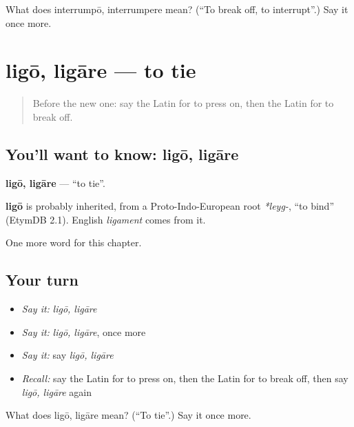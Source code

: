 \begin{tcolorbox}[breakable,colback=teal!4,colframe=teal!35!black,title={Before you move on}]
What does interrumpō, interrumpere mean? (\textquotedblleft{}To break off, to interrupt\textquotedblright{}.) Say it once more.
\end{tcolorbox}
\section[ligō, ligāre]{ligō, ligāre — to tie}

\label{lesson:LA-C233-ligo}



\begin{quote}
Before the new one: say the Latin for to press on, then the Latin for to break off.
\end{quote}

\subsection*{You'll want to know: ligō, ligāre}
\textbf{ligō, ligāre} — \textquotedblleft{}to tie\textquotedblright{}.

\begin{cousinweb}
\textbf{ligō} is probably inherited, from a Proto-Indo-European root \emph{*leyg-}, \textquotedblleft{}to bind\textquotedblright{} (EtymDB 2.1). English \emph{ligament} comes from it.
\end{cousinweb}

\begin{grammarlens}[title={What you've built}]
One more word for this chapter.
\end{grammarlens}

\subsection*{Your turn}
\begin{itemize}
\raggedright
  \item \emph{Say it:} \emph{ligō, ligāre}
  \item \emph{Say it:} \emph{ligō, ligāre}, once more
  \item \emph{Say it:} say \emph{ligō, ligāre}
  \item \emph{Recall:} say the Latin for to press on, then the Latin for to break off, then say \emph{ligō, ligāre} again
\end{itemize}

\begin{tcolorbox}[breakable,colback=teal!4,colframe=teal!35!black,title={Before you move on}]
What does ligō, ligāre mean? (\textquotedblleft{}To tie\textquotedblright{}.) Say it once more.
\end{tcolorbox}
